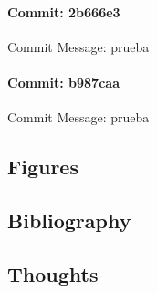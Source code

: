 \documentclass{article}
\begin{document}
\paragraph{Commit: 2b666e3}
Commit Message: prueba

\paragraph{Commit: b987caa}
Commit Message: prueba

\subsection{Figures}

\subsection{Bibliography}
\subsection{Thoughts}
\end{document}
